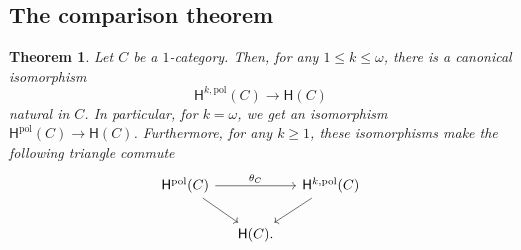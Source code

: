 \documentclass[reqno]{amsart}
\theoremstyle{plain}
\newtheorem{theorem}[subsubsection]{Theorem}
\theoremstyle{definition}
\theoremstyle{remark}
\newcommand{\functor}[1]{\mathsf{#1}} %
\newcommand{\homnat}{\theta}%
\newcommand{\oo}{\ensuremath{\omega}}
\newcommand{\Ho}{\functor{H}} %
\newcommand{\Hop}[1]{\Ho^{#1,\mathrm{pol}}} %
\newcommand{\Hopol}{\Ho^{\mathrm{pol}}}%
\newcommand{\nbd}{\nobreakdash} %
\begin{document}
\subsection{The comparison theorem}
\begin{theorem}\label{thm:polhom}
  Let $C$ be a $1$\nbd-category. Then, for any $1
  \leq k \leq \oo$, there is a canonical isomorphism
  \[
    \Hop{k}(C) \to \Ho(C)
  \]
  natural in $C$. In particular, for $k=\oo$, we get an isomorphism
  $\Hopol(C) \to \Ho(C)$. Furthermore, for any $k\geq 1$, these
  isomorphisms make the following triangle commute
  \[
    \begin{tikzcd}[column sep=small]      
         \Hopol(C)\ar[dr]
         \ar[rr,"\homnat_C"]&&\Hop{k}(C)\ar[dl]\\
         &\Ho(C).&
    \end{tikzcd}
  \]
\end{theorem}
\end{document}
